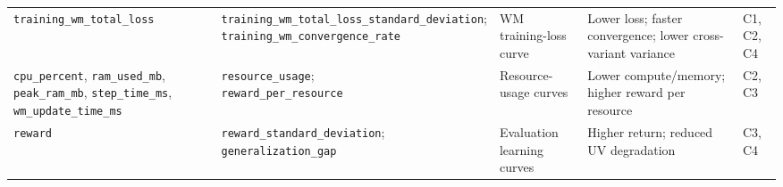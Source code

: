 \documentclass{article}
\theoremstyle{plain}
\theoremstyle{definition}
\theoremstyle{remark}
\begin{document}
\begin{table}[h!]
{\begin{tabular}{lllll}
      \texttt{training\_wm\_total\_loss}                                                                                            &
      \makecell[l]{
      \texttt{training\_wm\_total\_loss\_standard\_deviation};                                                                        \\
        \texttt{training\_wm\_convergence\_rate}
      }                                                                                                                             &
      WM training-loss curve                                                                                                        &
      Lower loss; faster convergence; lower cross-variant variance                                                                  &
      C1, C2, C4                                                                                                                      \\

      \texttt{cpu\_percent}, \texttt{ram\_used\_mb}, \texttt{peak\_ram\_mb}, \texttt{step\_time\_ms}, \texttt{wm\_update\_time\_ms} &
      \makecell[l]{
      \texttt{resource\_usage};                                                                                                       \\
        \texttt{reward\_per\_resource}
      }                                                                                                                             &
      Resource-usage curves                                                                                                         &
      Lower compute/memory; higher reward per resource                                                                              &
      C2, C3                                                                                                                          \\

      \texttt{reward}                                                                                                               &
      \makecell[l]{
      \texttt{reward\_standard\_deviation};                                                                                           \\
        \texttt{generalization\_gap}
      }                                                                                                                             &
      Evaluation learning curves                                                                                                    &
      Higher return; reduced UV degradation                                                                                         &
      C3, C4                                                                                                                          \\


\end{tabular}}
\end{table}
\end{document}

